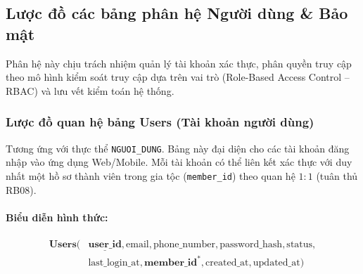 \subsection{Lược đồ các bảng phân hệ Người dùng \& Bảo mật}
\label{subsec:luoc_do_security}

Phân hệ này chịu trách nhiệm quản lý tài khoản xác thực, phân quyền truy cập theo mô hình kiểm soát truy cập dựa trên vai trò (Role-Based Access Control -- RBAC) và lưu vết kiểm toán hệ thống.

\subsubsection{Lược đồ quan hệ bảng Users (Tài khoản người dùng)}
Tương ứng với thực thể \texttt{NGUOI\_DUNG}. Bảng này đại diện cho các tài khoản đăng nhập vào ứng dụng Web/Mobile. Mỗi tài khoản có thể liên kết xác thực với duy nhất một hồ sơ thành viên trong gia tộc (\texttt{member\_id}) theo quan hệ $1:1$ (tuân thủ RB08).

\paragraph{Biểu diễn hình thức:}
\[
\begin{aligned}
\textbf{Users}\big(
&\underline{\textbf{user\_id}}, \text{email}, \text{phone\_number}, \text{password\_hash}, \text{status}, \\
&\text{last\_login\_at}, \textbf{member\_id}^*, \text{created\_at}, \text{updated\_at}
\big)
\end{aligned}
\]

